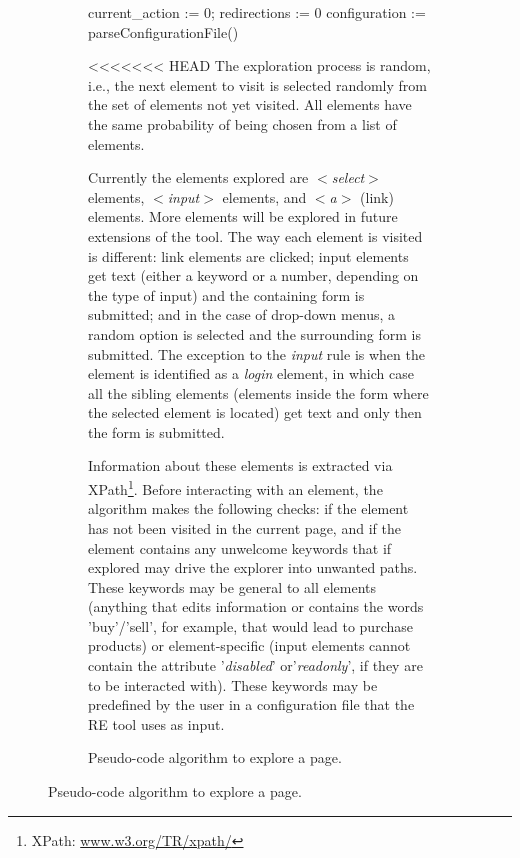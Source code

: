 \documentclass[conference]{IEEEtran}
\begin{document}
\begin{enumerate}
\begin{figure}[!htb]
\begin{itemize}
\begin{figure}[!htb]
\begin{algorithm}
  current\_action := 0; redirections := 0\;
  configuration := parseConfigurationFile()\;
  

\caption{Pseudo-code algorithm to explore a page.}\label{alg:seeker}
\end{algorithm}

<<<<<<< HEAD
The exploration process is random, i.e., the next element to visit is selected randomly from the set of elements not yet visited. All elements have the same probability of being chosen from a list of elements.

Currently the elements explored are \textit{$<$select$>$} elements, \textit{$<$input$>$} elements, and \textit{$<$a$>$} (link) elements. More elements will be explored in future extensions of the tool. The way each element is visited is different: link elements are clicked; input elements get text (either a keyword or a number, depending on the type of input) and the containing form is submitted; and in the case of drop-down menus, a random option is selected and the surrounding form is submitted. The exception to the \textit{input} rule is when the element is identified as a \textit{login} element, in which case all the sibling elements (elements inside the form where the selected element is located) get text and only then the form is submitted.

Information about these elements is extracted via XPath\footnote{XPath: \url{www.w3.org/TR/xpath/}}. Before interacting with an element, the algorithm makes the following checks: if the element has not been visited in the current page, and if the element contains any unwelcome keywords that if explored may drive the explorer into unwanted paths. These keywords may be general to all elements (anything that edits information or contains the words 'buy'/'sell', for example, that would lead to purchase products) or element-specific (input elements cannot contain the attribute '\textit{disabled}' or'\textit{readonly}', if they are to be interacted with). These keywords may be predefined by the user in a configuration file that the RE tool uses as input.


\end{figure}
\end{itemize}
\end{figure}
\end{enumerate}
\end{document}
